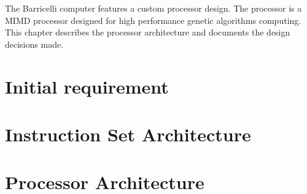 The Barricelli computer features a custom processor design.
The processor is a MIMD processor designed for high performance genetic algorithms computing.
This chapter describes the processor architecture and documents the design decisions made.



\section {Initial requirement}
     \label{fpga:section:initial_requirements}

\section{Instruction Set Architecture} \label{fpga:isa:s:isa}
    

\section {Processor Architecture}
     \label{fpga:section:cpu_architecture}
